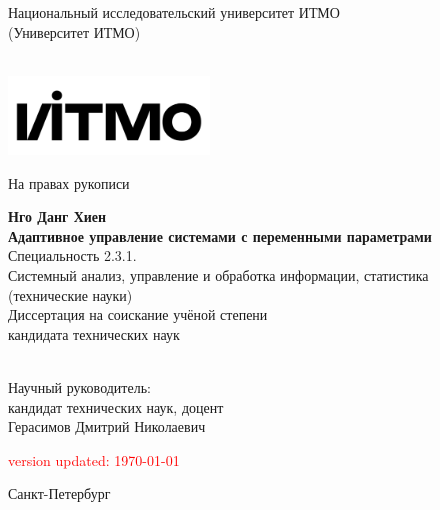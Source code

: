 \newcommand{\PhDStudent}{Нго Данг Хиен}
\newcommand{\ThesisName}{Адаптивное управление системами с переменными параметрами}
\newcommand{\MySpeciality}{Специальность 2.3.1.\\
	Системный анализ, управление и обработка информации, статистика\\
	(технические науки)}
\newcommand{\MySuperviser}{кандидат технических наук, доцент\\Герасимов Дмитрий Николаевич}
\thispagestyle{empty}

\begin{center}
	Национальный исследовательский университет ИТМО \\
	(Университет ИТМО) \\ \ \\ 
\end{center}
\begin{minipage}{16cm}
	\includegraphics[width=0.4\textwidth]{images/itmo/logo_osnovnoy_russkiy_chernyy}
	\hfill
\end{minipage}

\hfill На правах рукописи

\vspace*{60pt}
\begin{center}
	\textbf {\large
		\PhDStudent
	} \\
	\vspace*{6pt}
	\textbf{{\LARGE 
		\ThesisName
	}} \\
	\vspace*{12pt}
		\MySpeciality \\
	\vspace*{12pt}
	Диссертация на соискание учёной степени \\ кандидата технических наук \\ \ \\ 
	\vspace*{60pt}
	\begin{flushright}
		Научный руководитель:\\ \MySuperviser
	\end{flushright}
\end{center}

\vspace*{10pt}
\begin{center} %
	\textcolor{red}{\tiny {version updated: \today}}
\end{center}

\vfill	%

\begin{center}
	Санкт-Петербург~\the\year{} \\%
\end{center}


\OnehalfSpacing